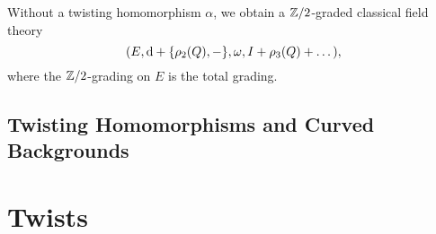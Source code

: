 \documentclass[10pt, oneside]{article}
\begin{document}
\begin{remark}
Without a twisting homomorphism $\alpha$, we obtain a $\mathbb Z/2$-graded classical field theory
\[(E, {\rm d} + \{\rho_2(Q), -\}, \omega, I + \rho_3(Q) + \dots),\]
where the $\mathbb Z/2$-grading on $E$ is the total grading.
\end{remark}

\subsection{Twisting Homomorphisms and Curved Backgrounds}


\section{Twists}

\end{document}
